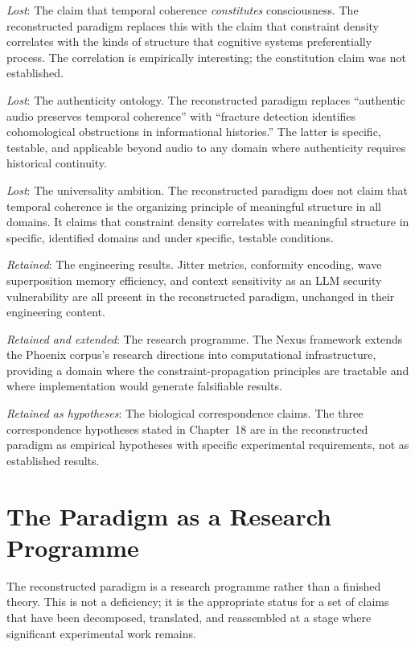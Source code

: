 \textit{Lost}: The claim that temporal coherence
\emph{constitutes} consciousness. The reconstructed
paradigm replaces this with the claim that constraint
density correlates with the kinds of structure that
cognitive systems preferentially process. The correlation
is empirically interesting; the constitution claim
was not established.

\textit{Lost}: The authenticity ontology. The
reconstructed paradigm replaces ``authentic audio
preserves temporal coherence'' with ``fracture detection
identifies cohomological obstructions in informational
histories.'' The latter is specific, testable, and
applicable beyond audio to any domain where authenticity
requires historical continuity.

\textit{Lost}: The universality ambition. The
reconstructed paradigm does not claim that temporal
coherence is the organizing principle of meaningful
structure in all domains. It claims that constraint
density correlates with meaningful structure in specific,
identified domains and under specific, testable conditions.

\textit{Retained}: The engineering results. Jitter
metrics, conformity encoding, wave superposition memory
efficiency, and context sensitivity as an LLM security
vulnerability are all present in the reconstructed
paradigm, unchanged in their engineering content.

\textit{Retained and extended}: The research programme.
The Nexus framework extends the Phoenix corpus's
research directions into computational infrastructure,
providing a domain where the constraint-propagation
principles are tractable and where implementation
would generate falsifiable results.

\textit{Retained as hypotheses}: The biological
correspondence claims. The three correspondence
hypotheses stated in Chapter~18 are in the reconstructed
paradigm as empirical hypotheses with specific experimental
requirements, not as established results.

\section{The Paradigm as a Research Programme}
\label{sec:paradigm-programme}

The reconstructed paradigm is a research programme
rather than a finished theory. This is not a deficiency;
it is the appropriate status for a set of claims that
have been decomposed, translated, and reassembled at
a stage where significant experimental work remains.

